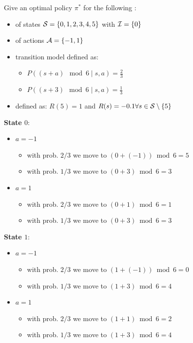 Give an optimal policy $\pi^{*}$ for the following :
\begin{itemize}
    \item {} of states $\mathcal{S} = \left\{0,1,2,3,4,5\right\}$ with $\mathcal{I} = \left\{0\right\}$
    \item {} of actions $\mathcal{A} = \left\{-1,1\right\}$
    \item transition model defined as:
    \begin{itemize}
        \item $P((s+a) \mod 6 \mid s,a) = \frac{2}{3}$
        \item $P((s+3) \mod 6 \mid s,a) = \frac{1}{3}$
    \end{itemize}
    \item {} defined as: $R(5) = 1$ and $R(s) = -0.1 \forall s \in \mathcal{S}\setminus\left\{5\right\}$
\end{itemize}


\textbf{State $0$}:

\begin{itemize}
    \item $a = -1$
    \begin{itemize}
        \item with prob. $2/3$ we move to $(0 + (-1)) \bmod 6 = 5$
        \item with prob. $1/3$ we move to $(0 + 3) \bmod 6 = 3$
    \end{itemize}
    \item $a = 1$
    \begin{itemize}
        \item with prob. $2/3$ we move to $(0 + 1) \bmod 6 = 1$
        \item with prob. $1/3$ we move to $(0 + 3) \bmod 6 = 3$
    \end{itemize}
\end{itemize}


\textbf{State $1$}:

\begin{itemize}
    \item $a = -1$
    \begin{itemize}
        \item with prob. $2/3$ we move to $(1 + (-1)) \bmod 6 = 0$
        \item with prob. $1/3$ we move to $(1 + 3) \bmod 6 = 4$
    \end{itemize}
    \item $a = 1$
    \begin{itemize}
        \item with prob. $2/3$ we move to $(1 + 1) \bmod 6 = 2$
        \item with prob. $1/3$ we move to $(1 + 3) \bmod 6 = 4$
    \end{itemize}
\end{itemize}

